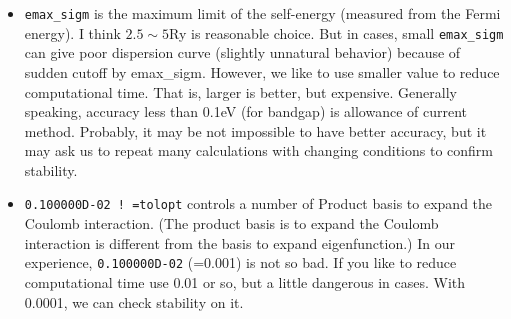 \documentclass[a4paper,10pt,epsf,fleqn]{article}
\begin{document}
\begin{itemize}
\item
\verb+emax_sigm+ is the maximum limit of the self-energy 
(measured from the Fermi energy). I think $2.5\sim5$Ry is reasonable choice.
But in cases, small \verb+emax_sigm+ can give poor dispersion curve
(slightly unnatural behavior) because of sudden cutoff by emax\_sigm.
However, we like to use smaller value to reduce computational time.
That is, larger is better, but expensive. 
Generally speaking, accuracy less than 0.1eV (for bandgap) 
is allowance of current method. Probably, it may be not impossible to have better accuracy, 
but it may ask us to repeat many calculations with changing conditions
to confirm stability. 

\item
\verb+0.100000D-02 ! =tolopt+ controls a number of Product basis
to expand the Coulomb interaction. (The product basis is to expand the
Coulomb interaction is different from the basis to expand eigenfunction.)
In our experience, \verb+0.100000D-02+ (=0.001) is not so bad.
If you like to reduce computational time use 0.01 or so, but a little
dangerous in cases. With 0.0001, we can check stability on it.


\end{itemize}
\end{document}
